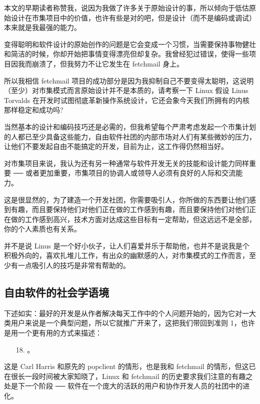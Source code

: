 本文的早期读者称赞我，说因为我做了许多关于原始设计的事，所以倾向于低估原始设计在市集项目中的价值，也许有些是对的吧，但是设计（而不是编码或调试）本来就是我最强的能力。


变得聪明和软件设计的原始创作的问题是它会变成一个习惯，当需要保持事物健壮和简洁的时候，你却开始把事情变得漂亮但却复杂。我曾经犯过错误，使得一些项目因我而崩溃了，但我努力不让它发生在 fetchmail 身上。


所以我相信 fetchmail 项目的成功部分是因为我抑制自己不要变得太聪明，这说明（至少）对市集模式而言原始设计并不是本质的，请考察一下 Linux 假设 Linus Torvalds 在开发时试图彻底革新操作系统设计，它还会象今天我们所拥有的内核那样稳定和成功吗?


当然基本的设计和编码技巧还是必需的，但我希望每个严肃考虑发起一个市集计划的人都已至少具备这些能力，自由软件社团的内部市场对人们有某些微妙的压力，让他们不要发起自由不能搞定的开发，目前为止，这工作得仍然相当好。


对市集项目来说，我认为还有另一种通常与软件开发无关的技能和设计能力同样重要 ── 或者更加重要，市集项目的协调人或领导人必须有良好的人际和交流能力。


这是很显然的，为了建造一个开发社团，你需要吸引人，你所做的东西要让他们感到有趣，而且要保持他们对他们正在做的工作感到有趣，而且要保持他们对他们正在做的工作感到高兴，技术方面对达成这些目标有一定帮助，但这远远不是全部，你的个人素质也有关系。


并不是说 Linus 是一个好小伙子，让人们喜爱并乐于帮助他，也并不是说我是个积极外向的，喜欢扎堆儿工作，有出众的幽默感的人，对市集模式的工作而言，至少有一点吸引人的技巧是非常有帮助的。


\subsection{自由软件的社会学语境}


下述如实：最好的开发是从作者解决每天工作中的个人问题开始的，因为它对一大类用户来说是一个典型问题，所以它就推广开来了，这把我们带回到准则 1，也许是用一个更有用的方式来描述：

\begin{enumerate}
\item[18.] 。
\end{enumerate}

这是 Carl Harris 和原先的 popclient 的情形，也是我和 fetchmail 的情形，但这已在很长一段时间被大家知晓了，Linux 和 fetchmail 的历史要求我们注意的有趣之处是下一个阶段 ── 软件在一个庞大的活跃的用户和协作开发人员的社团中的进化。

